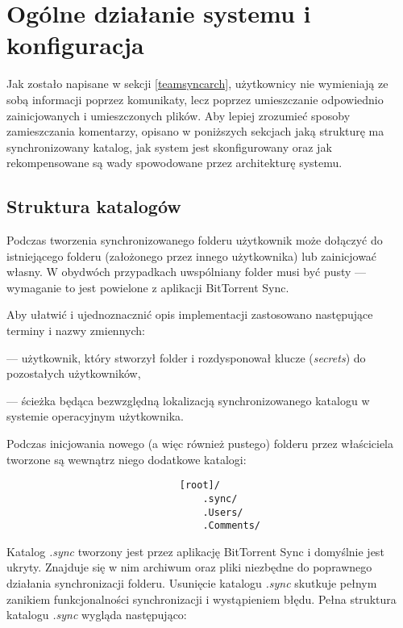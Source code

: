 \chapter{Ogólne działanie systemu i konfiguracja}

Jak zostało napisane w sekcji \ref{teamsyncarch}, użytkownicy nie wymieniają ze sobą informacji poprzez komunikaty, lecz poprzez umieszczanie odpowiednio zainicjowanych i umieszczonych plików. Aby lepiej zrozumieć sposoby zamieszczania komentarzy, opisano w poniższych sekcjach jaką strukturę ma synchronizowany katalog, jak system jest skonfigurowany oraz jak rekompensowane są wady spowodowane przez architekturę systemu.

\section{Struktura katalogów}

\label{directorystructure}

Podczas tworzenia synchronizowanego folderu użytkownik może dołączyć do istniejącego folderu (założonego przez innego użytkownika) lub zainicjować własny. W obydwóch przypadkach uwspólniany folder musi być pusty --- wymaganie to jest powielone z aplikacji BitTorrent Sync.

Aby ułatwić i ujednoznacznić opis implementacji zastosowano następujące terminy i nazwy zmiennych:

\begin{description}[noitemsep]
 \item[właściciel] --- użytkownik, który stworzył folder i rozdysponował klucze (\emph{secrets}) do pozostałych użytkowników,
 
 \item[\textbf{[root]}] --- ścieżka będąca bezwzględną lokalizacją synchronizowanego katalogu w systemie operacyjnym użytkownika.
\end{description}

Podczas inicjowania nowego (a więc również pustego) folderu przez właściciela tworzone są wewnątrz niego dodatkowe katalogi:


\begin{verbatim}
                              [root]/
                                  .sync/
                                  .Users/
                                  .Comments/
\end{verbatim}

Katalog \emph{.sync} tworzony jest przez aplikację BitTorrent Sync i domyślnie jest ukryty. Znajduje się w nim archiwum oraz pliki niezbędne do poprawnego działania synchronizacji folderu. Usunięcie katalogu \emph{.sync} skutkuje pełnym zanikiem funkcjonalności synchronizacji i wystąpieniem błędu. Pełna struktura katalogu \emph{.sync} wygląda następująco:


